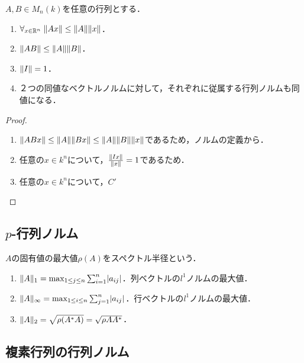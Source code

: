 \documentclass[uplatex, dvipdfmx]{jsreport}
\begin{document}
\begin{lemma}[行列ノルムの性質]
    $A,B\in M_n(k)$を任意の行列とする．
    \begin{enumerate}
        \item $\forall_{x\in\mathbb{R}^n}\;\|Ax\|\le\|A\|\|x\|$．
        \item $\|AB\|\le\|A\|\|B\|$．
        \item $\|I\|=1$．
        \item ２つの同値なベクトルノルムに対して，それぞれに従属する行列ノルムも同値になる．
    \end{enumerate}
\end{lemma}
\begin{proof}\mbox{}
    \begin{enumerate}
        \item $\|ABx\|\le\|A\|\|Bx\|\le\|A\|\|B\|\|x\|$であるため，ノルムの定義から．
        \item 任意の$x\in k^n$について，$\frac{\|Ix\|}{\|x\|}=1$であるため．
        \item 任意の$x\in k^n$について，$C'$
    \end{enumerate}
\end{proof}

\subsection{$p$-行列ノルム}

\begin{definition}
    $A$の固有値の最大値$\rho(A)$をスペクトル半径という．
\end{definition}

\begin{proposition}[p-行列ノルムの特徴付け]\mbox{}
    \begin{enumerate}
        \item $\|A\|_1=\max_{1\le j\le n}\sum_{i=1}^n\lvert a_{ij}\rvert$．列ベクトルの$l^1$ノルムの最大値．
        \item $\|A\|_\infty=\max_{1\le i\le n}\sum_{j=1}^n\lvert a_{ij}\rvert$．行ベクトルの$l^1$ノルムの最大値．
        \item $\|A\|_2=\sqrt{\rho(A^*A)}=\sqrt{\rho{AA^*}}$．
    \end{enumerate}
\end{proposition}

\subsection{複素行列の行列ノルム}
\end{document}
